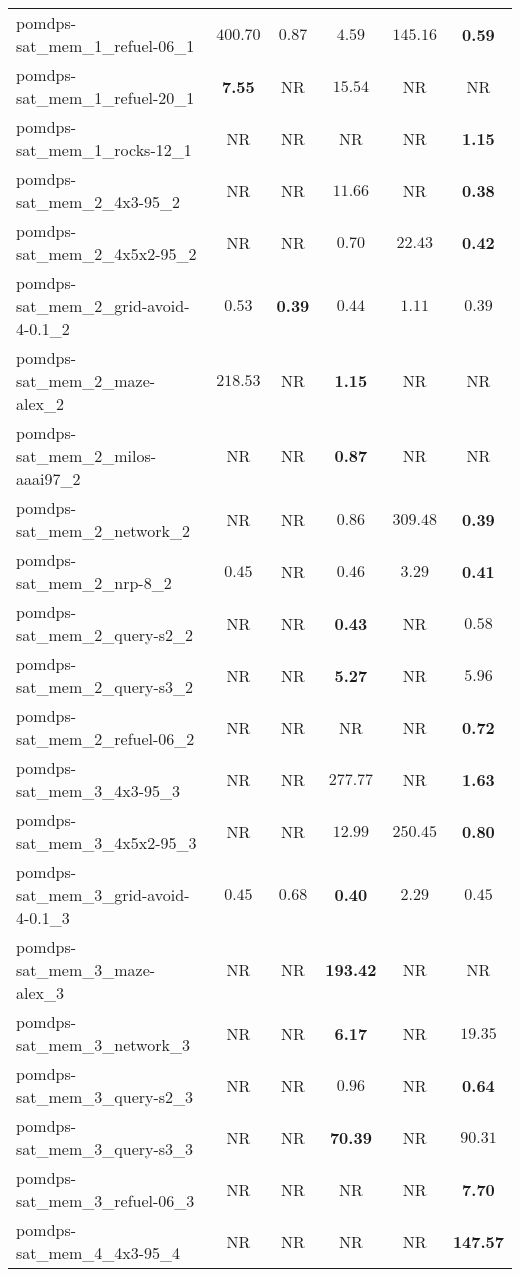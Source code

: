 \begin{tabular}{lccccc}
pomdps-sat\_mem\_1\_refuel-06\_1 & $400.70$ & $0.87$ & $4.59$ & $145.16$ & \textbf{0.59} \\
pomdps-sat\_mem\_1\_refuel-20\_1 & \textbf{7.55} & NR & $15.54$ & NR & NR \\
pomdps-sat\_mem\_1\_rocks-12\_1 & NR & NR & NR & NR & \textbf{1.15} \\
pomdps-sat\_mem\_2\_4x3-95\_2 & NR & NR & $11.66$ & NR & \textbf{0.38} \\
pomdps-sat\_mem\_2\_4x5x2-95\_2 & NR & NR & $0.70$ & $22.43$ & \textbf{0.42} \\
pomdps-sat\_mem\_2\_grid-avoid-4-0.1\_2 & $0.53$ & \textbf{0.39} & $0.44$ & $1.11$ & $0.39$ \\
pomdps-sat\_mem\_2\_maze-alex\_2 & $218.53$ & NR & \textbf{1.15} & NR & NR \\
pomdps-sat\_mem\_2\_milos-aaai97\_2 & NR & NR & \textbf{0.87} & NR & NR \\
pomdps-sat\_mem\_2\_network\_2 & NR & NR & $0.86$ & $309.48$ & \textbf{0.39} \\
pomdps-sat\_mem\_2\_nrp-8\_2 & $0.45$ & NR & $0.46$ & $3.29$ & \textbf{0.41} \\
pomdps-sat\_mem\_2\_query-s2\_2 & NR & NR & \textbf{0.43} & NR & $0.58$ \\
pomdps-sat\_mem\_2\_query-s3\_2 & NR & NR & \textbf{5.27} & NR & $5.96$ \\
pomdps-sat\_mem\_2\_refuel-06\_2 & NR & NR & NR & NR & \textbf{0.72} \\
pomdps-sat\_mem\_3\_4x3-95\_3 & NR & NR & $277.77$ & NR & \textbf{1.63} \\
pomdps-sat\_mem\_3\_4x5x2-95\_3 & NR & NR & $12.99$ & $250.45$ & \textbf{0.80} \\
pomdps-sat\_mem\_3\_grid-avoid-4-0.1\_3 & $0.45$ & $0.68$ & \textbf{0.40} & $2.29$ & $0.45$ \\
pomdps-sat\_mem\_3\_maze-alex\_3 & NR & NR & \textbf{193.42} & NR & NR \\
pomdps-sat\_mem\_3\_network\_3 & NR & NR & \textbf{6.17} & NR & $19.35$ \\
pomdps-sat\_mem\_3\_query-s2\_3 & NR & NR & $0.96$ & NR & \textbf{0.64} \\
pomdps-sat\_mem\_3\_query-s3\_3 & NR & NR & \textbf{70.39} & NR & $90.31$ \\
pomdps-sat\_mem\_3\_refuel-06\_3 & NR & NR & NR & NR & \textbf{7.70} \\
pomdps-sat\_mem\_4\_4x3-95\_4 & NR & NR & NR & NR & \textbf{147.57} \\

\end{tabular}
